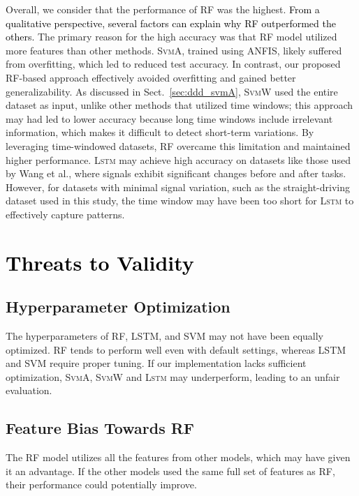 \documentclass[letterpaper, 10 pt, conference]{ieeeconf}  %
\newcommand{\Review}[1]{\textcolor{black}{#1}}
\newcommand{\Impl}[1]{\textsc{#1}}
\begin{document}
Overall, we consider that the performance of \Impl{RF} was the highest.
%
\Review{From a qualitative perspective, several factors can explain why \Impl{RF} outperformed the others.}
The primary reason for the high accuracy was that \Impl{RF} model utilized more features than other methods.
\Impl{SvmA}, trained using ANFIS, likely suffered from overfitting, which led to reduced test accuracy. 
In contrast, our proposed RF-based approach effectively avoided overfitting and gained better generalizability. 
As discussed in Sect.~\ref{sec:ddd_svmA}, \Impl{SvmW} used the entire dataset as input, unlike other methods that utilized time windows;
this approach may had led to lower accuracy because long time windows include irrelevant information, which makes it difficult to detect short-term variations. 
By leveraging time-windowed datasets, \Impl{RF} overcame this limitation and maintained higher performance.
\Impl{Lstm} may achieve high accuracy on datasets like those used by Wang et al., where signals exhibit significant changes before and after tasks. 
However, for datasets with minimal signal variation, such as the straight-driving dataset used in this study, the time window may have been too short for \Impl{Lstm} to effectively capture patterns.

\section{\Review{Threats to Validity}}\label{sec:threats}

\subsection{Hyperparameter Optimization}
The hyperparameters of RF, LSTM, and SVM may not have been equally optimized.
RF tends to perform well even with default settings, whereas LSTM and SVM require proper tuning.
If our implementation lacks sufficient optimization, \Impl{SvmA}, \Impl{SvmW} and \Impl{Lstm} may underperform, leading to an unfair evaluation.

\subsection{Feature Bias Towards RF}
The RF model utilizes all the features from other models, which may have given it an advantage.
If the other models used the same full set of features as RF, their performance could potentially improve.
\end{document}

